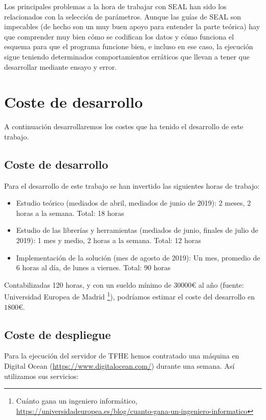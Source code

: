 Los principales problemas a la hora de trabajar con SEAL han sido los relacionados con la selección de parámetros. Aunque las guías de SEAL son impecables (de hecho son un muy buen apoyo para entender la parte teórica) hay que comprender muy bien cómo se codifican los datos y cómo funciona el esquema para que el programa funcione bien, e incluso en ese caso, la ejecución sigue teniendo determinados comportamientos erráticos que llevan a tener que desarrollar mediante ensayo y error.

\section{Coste de desarrollo}

A continuación desarrollaremos los costes que ha tenido el desarrollo de este trabajo.

\subsection{Coste de desarrollo}

Para el desarrollo de este trabajo se han invertido las siguientes horas de trabajo:

\begin{itemize}
    \item Estudio teórico (mediados de abril, mediados de junio de 2019): 2 meses, 2 horas a la semana. Total: 18 horas
    \item Estudio de las librerías y herramientas (mediados de junio, finales de julio de 2019): 1 mes y medio, 2 horas a la semana. Total: 12 horas
    \item Implementación de la solución (mes de agosto de 2019): Un mes, promedio de 6 horas al día, de lunes a viernes. Total: 90 horas
\end{itemize}

Contabilizadas 120 horas, y con un sueldo mínimo de $30000$\euro{} al año (fuente: Universidad Europea de Madrid \footnote{Cuánto gana un ingeniero informático, \url{https://universidadeuropea.es/blog/cuanto-gana-un-ingeniero-informatico}}), podríamos estimar el coste del desarrollo en $1800$\euro{}.

\subsection{Coste de despliegue}

Para la ejecución del servidor de TFHE hemos contratado una máquina en Digital Ocean (\url{https://www.digitalocean.com/}) durante una semana. Así utilizamos sus servicios:

